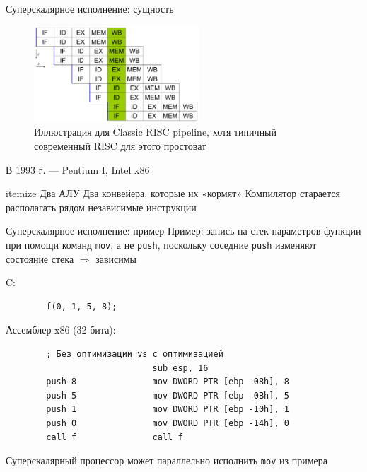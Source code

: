 \documentclass[xetex,aspectratio=43]{beamer}
\begin{document}
\begin{frame}{Суперскалярное исполнение: сущность}
    \begin{figure}
        \includegraphics[width=0.55\textwidth]{img/11.superscalar_pipeline.pdf}
        \caption{Иллюстрация для Classic RISC pipeline, хотя типичный современный RISC для этого простоват}
    \end{figure}

    \pause

    В 1993 г. — Pentium I, Intel x86

    \begin{outline}{itemize}
        \1 Два АЛУ
        \1 Два конвейера, которые их «кормят»
        \1 Компилятор старается располагать рядом независимые инструкции
    \end{outline}

\end{frame}

\begin{frame}[fragile]{Суперскалярное исполнение: пример}
    Пример: запись на стек параметров функции при помощи команд \texttt{mov}, а не \texttt{push}, поскольку соседние \texttt{push} изменяют состояние стека $\Rightarrow$ зависимы

    C:
    \begin{verbatim}
        f(0, 1, 5, 8);
    \end{verbatim}

    Ассемблер x86 (32 бита):
    \begin{verbatim}
        ; Без оптимизации vs с оптимизацией
                             sub esp, 16
        push 8               mov DWORD PTR [ebp -08h], 8
        push 5               mov DWORD PTR [ebp -0Bh], 5
        push 1               mov DWORD PTR [ebp -10h], 1
        push 0               mov DWORD PTR [ebp -14h], 0
        call f               call f
    \end{verbatim}

    Суперскалярный процессор может параллельно исполнить \texttt{mov} из примера
\end{frame}
\end{document}
